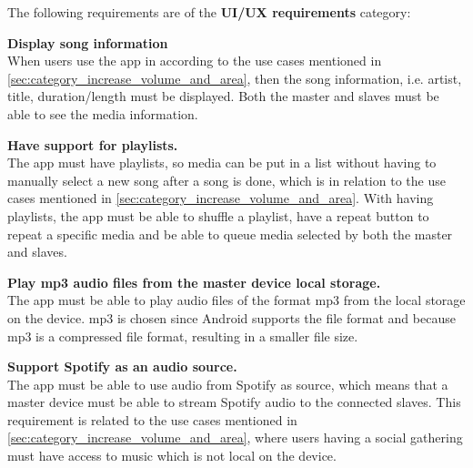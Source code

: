 The following requirements are of the \textbf{UI/UX requirements} category:
\begin{eletterate}[resume]
    \item \textbf{Display song information} \hfill\\
        When users use the app in according to the use cases mentioned in \cref{sec:category_increase_volume_and_area},
        then the song information, i.e. artist, title, duration/length must be displayed.
        Both the master and slaves must be able to see the media information.

    \item \textbf{Have support for playlists.} \hfill\\ 
        The app must have playlists, so media can be put in a list without having to manually select a new song after a song is done,
        which is in relation to the use cases mentioned in \cref{sec:category_increase_volume_and_area}.
        With having playlists, the app must be able to shuffle a playlist, 
        have a repeat button to repeat a specific media and be able to queue media selected by both the master and slaves.

    \item \textbf{Play mp3 audio files from the master device local storage.} \hfill\\
        The app must be able to play audio files of the format mp3 from the local storage on the device.
        mp3 is chosen since Android supports the file format and because mp3 is a compressed file format,
        resulting in a smaller file size\cite{android_mp3_support}\cite{mp3_compression}.

    \item \textbf{Support Spotify as an audio source.} \hfill\\
        The app must be able to use audio from Spotify as source,
        which means that a master device must be able to stream Spotify audio to the connected slaves.
        This requirement is related to the use cases mentioned in \cref{sec:category_increase_volume_and_area},
        where users having a social gathering must have access to music which is not local on the device.
\end{eletterate}
